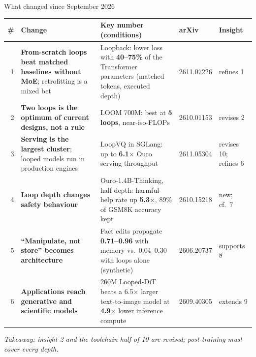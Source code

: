 \documentclass[aspectratio=169,10pt]{beamer}
\newcommand{\pos}[1]{\textcolor{positive}{#1}}
\newcommand{\con}[1]{\textcolor{negative}{#1}}
\newcommand{\HL}[1]{\textcolor{emphasis}{#1}}
\begin{document}
\begin{frame}{What changed since September 2026}
  \begin{center}
  \footnotesize\setlength{\tabcolsep}{4pt}
  \begin{tabular}{@{}r>{\raggedright\arraybackslash}p{}>{\raggedright\arraybackslash}p{}l>{\raggedright\arraybackslash}p{}@{}}
    \toprule
    \# & Change & Key number (conditions) & arXiv & Insight \\
    \midrule
    1 & \textbf{From-scratch loops beat matched baselines without MoE}; retrofitting is a mixed bet & Loopback: lower loss with \textbf{40--75\%} of the Transformer parameters (matched tokens, executed depth) & 2611.07226 & \pos{refines 1} \\
    2 & \textbf{Two loops is the optimum of current designs, not a rule} & LOOM 700M: best at \textbf{5 loops}, near-iso-FLOPs & 2610.01153 & \con{revises 2} \\
    3 & \textbf{Serving is the largest cluster}; looped models run in production engines & LoopVQ in SGLang: up to \textbf{6.1$\times$} Ouro serving throughput & 2611.05304 & \con{revises 10}; \pos{refines 6} \\
    4 & \textbf{Loop depth changes safety behaviour} & Ouro-1.4B-Thinking, half depth: harmful-help rate up \textbf{5.3$\times$}, 89\% of GSM8K accuracy kept & 2610.15218 & \HL{new}; cf.\ 7 \\
    5 & \textbf{``Manipulate, not store'' becomes architecture} & Fact edits propagate \textbf{0.71--0.96} with memory vs.\ 0.04--0.30 with loops alone (synthetic) & 2606.20737 & \pos{supports 8} \\
    6 & \textbf{Applications reach generative and scientific models} & 260M Looped-DiT beats a 6.5$\times$ larger text-to-image model at \textbf{4.9$\times$} lower inference compute & 2609.40305 & \pos{extends 9} \\
    \bottomrule
  \end{tabular}
  \end{center}
  \textit{Takeaway: insight 2 and the toolchain half of 10 are revised; post-training must cover every depth.}
\end{frame}
\end{document}
